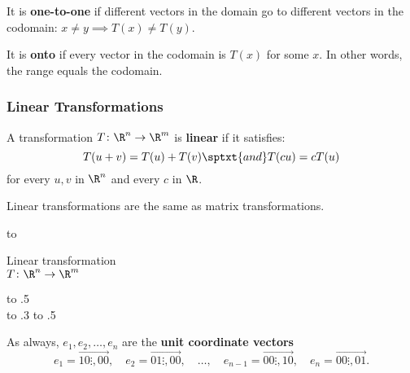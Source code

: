 \begin{frame}
\begin{center}
\begin{tikzpicture}[scale=0.35, baseline, thin border nodes]
\end{tikzpicture}
\end{center}

\pause
It is \textbf{one-to-one} if different vectors in the domain go to different
vectors in the codomain: $x\neq y\implies T(x)\neq T(y)$.

\pause\medskip
It is \textbf{onto} if every vector in the codomain is $T(x)$ for some $x$.
\pause
In other words, the range equals the codomain.

\end{frame}



\begin{frame}
\frametitle{Linear Transformations}

A transformation $T\colon\R^n\to\R^m$ is \textbf{linear} if it satisfies:
\[ T(u+v) = T(u) + T(v) \sptxt{and} T(cu) = cT(u) \]
for every $u,v$ in $\R^n$ and every $c$ in $\R$.

\pause\smallskip
\begin{bluebox}{.85\linewidth}\centering
  Linear transformations are the same as matrix transformations.
\end{bluebox}

\pause
\hbox to 
\pause\leavevmode
\parbox{.3\linewidth}{\centering
  Linear transformation\\$T\colon\R^n\to\R^m$}%
\;\longsquiggly\;
\hbox to .5\\[1mm]
\pause\leavevmode
\hbox to .3\linewidth{\hfil
  $\begin{aligned}&T(x) = Ax\\&T\colon\R^n\to\R^m\end{aligned}$\hfil}%
\;\rlongsquiggly\;
\hbox to .5\linewidth{$m\times n$ matrix $A$\hfil}

\pause\smallskip
As always, $e_1,e_2,\ldots,e_n$ are the \textbf{unit coordinate vectors}\small
\[ e_1 = \vec{1 0 \vdots, 0 0},\quad e_2 = \vec{0 1 \vdots, 0 0},\quad\ldots,\quad
   e_{n-1} = \vec{0 0 \vdots, 1 0},\quad e_n = \vec{0 0 \vdots, 0 1}. \]

\end{frame}



